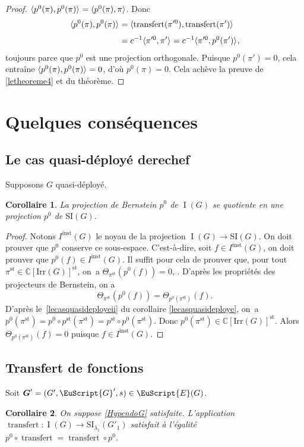 \documentclass[JEP,XML,SOM,Unicode,francais]{cedram}
\let\mathcal \EuScript
\newcommand{\NoChangel}[1]{%
\expandafter\let\csname old\string#1\endcsname=#1
\let#1=\relax
\newcommand{#1}{\mathcode`l="716C\csname old\string#1\endcsname\mathcode`l="7160 }%
}
\let\<\langle
\let\>\rangle
\newcommand{\rell}{\mathrm{ell}} \NoChangel{\rell}
\newcommand{\inst}{\mathrm{inst}}
\newcommand{\Irr}{\mathrm{Irr}}
\newcommand{\SI}{\mathrm{SI}}
\newcommand{\st}{\mathrm{st}}
\DeclareMathOperator{\rI}{I}
\DeclareMathOperator{\transfert}{transfert}
\newcommand{\bG}{\boldsymbol{G}}
\newcommand{\cE}{\mathcal{E}}
\newcommand{\cG}{\mathcal{G}}
\newcommand{\CC}{\mathbb{C}}
\theoremstyle{plain}
\newtheorem*{cor*}{Corollaire}
\theoremstyle{definition}
\begin{document}
\begin{proof}
$\<p^0(\pi),p^0(\pi)\>_{\rell}=\<p^0(\pi),\pi\>_{\rell}$. Donc
\begin{align*}
\<p^0(\pi),p^0(\pi)\>_{\rell}&=\<\transfert_{\rell}(\pi^{\prime0}),\transfert_{\rell}(\pi')\>_{\rell}\\
&=c^{-1}\<\pi^{\prime0},\pi'\>_{\rell}=c^{-1}\<\pi^{\prime0},p^0(\pi')\>_{\rell},
\end{align*}
toujours parce que $p^0$ est une projection orthogonale. Puisque $p^0(\pi')=0$, cela entraîne
$\<p^0(\pi),p^0(\pi)\>_{\rell}=0$, d'où $p^0(\pi)=0$. Cela achève la preuve de \eqref{letheoreme4} et du théorème.
\end{proof}

\section{Quelques conséquences}

\subsection{Le cas quasi-déployé derechef}\label{derechef}
Supposons $G$ quasi-déployé.
\begin{cor*}
La projection de Bernstein $p^0$ de $\rI(G)$ se quotiente en une projection $p^0$ de $\SI(G)$.
\end{cor*}

\begin{proof}
Notons $I^{\inst}(G)$ le noyau de la projection $\rI(G)\to \SI(G)$. On doit prouver que $p^0$ conserve ce sous-espace. C'est-à-dire, soit $f\in I^{\inst}(G)$, on doit prouver que $p^0(f)\in I^{\inst}(G)$. Il suffit pour cela de prouver que, pour tout $\pi^{\st}\in \CC[\Irr(G)]^{\st}$, on~a $\Theta_{\pi^{\st}}(p^0(f))=0$, \cf \cite[Cor.\,XI.5.2(i)]{MW}. D'après les propriétés des projecteurs de Bernstein, on a
\[
\Theta_{\pi^{\st}}(p^0(f))=\Theta_{p^0(\pi^{\st})}(f).
\]
D'après le~\eqref{lecasquasideployeii} du corollaire \ref{lecasquasideploye}, on~a $p^0(\pi^{\st})=p^0\circ p^{\st}(\pi^{\st})=p^{\st}\circ p^0(\pi^{\st})$. Donc $p^0(\pi^{\st})\in \CC[\Irr(G)]^{\st}$. Alors $\Theta_{p^0(\pi^{\st})}(f)=0$ puisque $f\in I^{\inst}(G)$.
\end{proof}

\subsection{Transfert de fonctions}\label{transfertdefonctions}
Soit $\bG'=(G',\cG',s)\in \cE(G)$.
\begin{cor*}
On suppose \ref{HypendoG} satisfaite. L'application $\transfert:\rI(G)\to \SI_{\lambda_{1}}(G'_{1})$ satisfait à l'égalité $p^0\circ \transfert=\transfert\circ p^0$.
\end{cor*}
\end{document}
